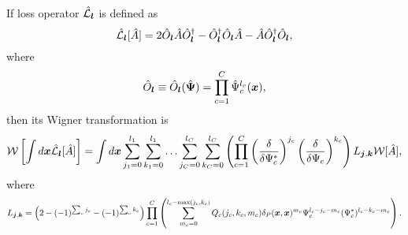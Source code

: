\begin{theorem}
\label{thm:formalism:transformations:w-losses}
If loss operator $\hat{\mathcal{L}}_{\boldsymbol{l}}$ is defined as
\[
	\hat{\mathcal{L}}_{\boldsymbol{l}} [\hat{A}]
	= 2 \hat{O}_{\boldsymbol{l}} \hat{A} \hat{O}_{\boldsymbol{l}}^\dagger
		- \hat{O}_{\boldsymbol{l}}^\dagger \hat{O}_{\boldsymbol{l}} \hat{A}
		- \hat{A} \hat{O}_{\boldsymbol{l}}^\dagger \hat{O}_{\boldsymbol{l}},
\]
where
\[
	\hat{O}_{\boldsymbol{l}}
	\equiv \hat{O}_{\boldsymbol{l}} (\hat{\boldsymbol{\Psi}})
	= \prod_{c=1}^C \hat{\Psi}_c^{l_c} (\boldsymbol{x}),
\]
then its Wigner transformation is
\[
	\mathcal{W} \left[ \int d\boldsymbol{x} \hat{\mathcal{L}}_{\boldsymbol{l}} [\hat{A}] \right]
	= \int d\boldsymbol{x}
		\sum_{j_1=0}^{l_1} \sum_{k_1=0}^{l_1} \ldots
		\sum_{j_C=0}^{l_C} \sum_{k_C=0}^{l_C}
			\left(
				\prod_{c=1}^C
					\left( \frac{\delta}{\delta \Psi_c^*} \right)^{j_c}
					\left( \frac{\delta}{\delta \Psi_c} \right)^{k_c}
			\right)
			L_{\boldsymbol{j}, \boldsymbol{k}}
		\mathcal{W}[\hat{A}],
\]
where
\[
	L_{\boldsymbol{j}, \boldsymbol{k}}
	= \left( 2 - (-1)^{\sum_c j_c} - (-1)^{\sum_c k_c} \right)
		\prod_{c=1}^C \left(
			\sum_{m_c=0}^{l_c - \max(j_c, k_c)}
			Q_c(j_c, k_c, m_c)
			\delta_P(\boldsymbol{x}, \boldsymbol{x})^{m_c}
			\Psi_c^{l_c - j_c - m_c}
			(\Psi_c^*)^{l_c - k_c - m_c}
		\right).
\]
\end{theorem}
